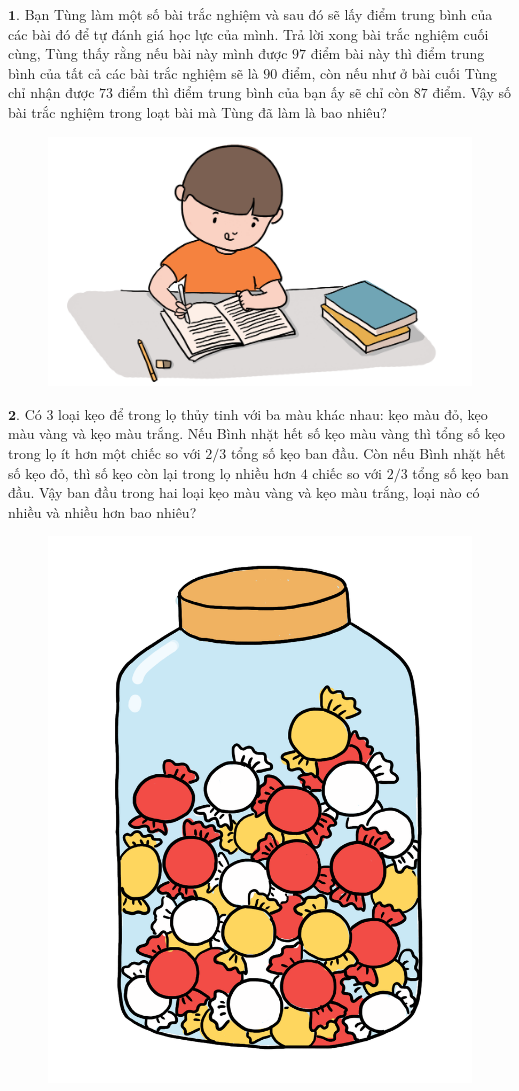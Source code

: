 \centering
\endgroup
\vspace*{35pt}

\begin{multicols}{2}
	$\pmb{1.}$ Bạn Tùng làm một số bài trắc nghiệm và sau đó sẽ lấy điểm trung bình của các bài đó để tự đánh giá học lực của mình. Trả lời xong bài trắc nghiệm cuối cùng, Tùng thấy rằng nếu bài này mình được $97$ điểm bài này thì điểm trung bình của tất cả các bài trắc nghiệm sẽ là $90$ điểm, còn nếu như ở bài cuối Tùng chỉ nhận được $73$ điểm thì điểm trung bình của bạn ấy sẽ chỉ còn $87$ điểm. Vậy số bài trắc nghiệm trong loạt bài mà Tùng đã làm là bao nhiêu?
	\begin{figure}[H]
		\centering
		\vspace*{-10pt}
		\captionsetup{labelformat= empty, justification=centering}
		\includegraphics[width=0.95\linewidth]{Pi12_Bai1}
		\vspace*{-10pt}
	\end{figure}
	\vskip 0.1cm
	$\pmb{2.}$ Có $3$ loại kẹo để trong lọ thủy tinh với ba màu khác nhau: kẹo màu đỏ, kẹo màu vàng và kẹo màu trắng. Nếu Bình nhặt hết số kẹo màu vàng thì tổng số kẹo trong lọ ít hơn một chiếc so với $2/3$ tổng số kẹo ban đầu. Còn nếu Bình nhặt hết số kẹo đỏ, thì số kẹo còn lại trong lọ nhiều hơn $4$ chiếc so với $2/3$ tổng số kẹo ban đầu.
	\vskip 0.1cm
	Vậy ban đầu trong hai loại kẹo màu vàng và kẹo màu trắng, loại nào có nhiều và nhiều hơn bao nhiêu?
	\begin{figure}[H]
		\centering
		\vspace*{-10pt}
		\captionsetup{labelformat= empty, justification=centering}
		\includegraphics[width=0.45\linewidth]{Pi12_Bai2}

\end{figure}
\end{multicols}
